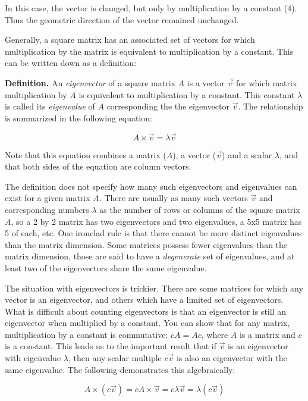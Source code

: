 \documentclass[
  letterpaper,
  DIV=11,
  numbers=noendperiod]{scrreprt}
\begin{document}
In this case, the vector is changed, but only by multiplication by a
constant (4). Thus the geometric direction of the vector remained
unchanged.

Generally, a square matrix has an associated set of vectors for which
multiplication by the matrix is equivalent to multiplication by a
constant. This can be written down as a definition:

\textbf{Definition.} An \emph{eigenvector} of a square matrix \(A\) is a
vector \(\vec v\) for which matrix multiplication by \(A\) is equivalent
to multiplication by a constant. This constant \(\lambda\) is called its
\emph{eigenvalue} of \(A\) corresponding the the eigenvector \(\vec v\).
The relationship is summarized in the following equation:

\[
A  \times  \vec v = \lambda \vec v
\]

Note that this equation combines a matrix (\(A\)), a vector (\(\vec v\))
and a scalar \(\lambda\), and that both sides of the equation are column
vectors.

The definition does not specify how many such eigenvectors and
eigenvalues can exist for a given matrix \(A\). There are usually as
many such vectors \(\vec v\) and corresponding numbers \(\lambda\) as
the number of rows or columns of the square matrix \(A\), so a 2 by 2
matrix has two eigenvectors and two eigenvalues, a 5x5 matrix has 5 of
each, etc. One ironclad rule is that there cannot be more distinct
eigenvalues than the matrix dimension. Some matrices possess fewer
eigenvalues than the matrix dimension, those are said to have a
\emph{degenerate} set of eigenvalues, and at least two of the
eigenvectors share the same eigenvalue.

The situation with eigenvectors is trickier. There are some matrices for
which any vector is an eigenvector, and others which have a limited set
of eigenvectors. What is difficult about counting eigenvectors is that
an eigenvector is still an eigenvector when multiplied by a constant.
You can show that for any matrix, multiplication by a constant is
commutative: \(cA = Ac\), where \(A\) is a matrix and \(c\) is a
constant. This leads us to the important result that if \(\vec v\) is an
eigenvector with eigenvalue \(\lambda\), then any scalar multiple
\(c \vec v\) is also an eigenvector with the same eigenvalue. The
following demonstrates this algebraically:

\[
A  \times  (c \vec v) = c A  \times  \vec v = c \lambda \vec v =  \lambda (c \vec v)
\]
\end{document}
